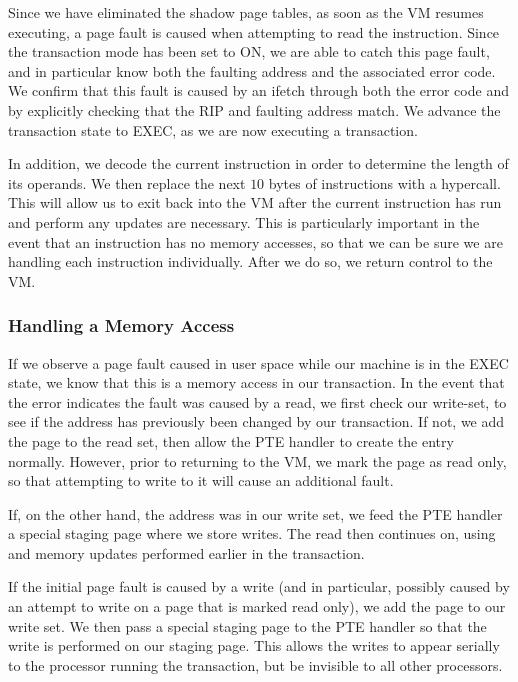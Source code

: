 \documentclass{acm_proc_article-sp}
\begin{document}
Since we have eliminated the shadow page tables, as soon as the VM resumes
executing, a page fault is caused when attempting to read the instruction.
Since the transaction mode has been set to ON, we are able to catch this
page fault, and in particular know both the faulting address and the associated
error code. We confirm that this fault is caused by an ifetch through both
the error code and by explicitly checking that the RIP and faulting address
match. We advance the transaction state to EXEC, as we are now executing
a transaction. 
  
In addition, we decode the current instruction in order to determine the length
of its operands. We then replace the next $10$ bytes of instructions with
a hypercall. This will allow us to exit back into the VM after the current
instruction has run and perform any updates are necessary. This is particularly
important in the event that an instruction has no memory accesses, so that we
can be sure we are handling each instruction individually. After we do so, 
we return control to the VM.

\subsubsection{Handling a Memory Access}

If we observe a page fault caused in user space while our machine is in the
EXEC state, we know that this is a memory access in our transaction. In the 
event that the error indicates the fault was caused by a read, we first check
our write-set, to see if the address has previously been changed by our 
transaction. If not, we add the page to the read set, then allow the PTE
handler to create the entry normally. However, prior to returning to the VM,
we mark the page as read only, so that attempting to write to it will cause
an additional fault.

If, on the other hand, the address was in our write set, we feed the PTE
handler a special staging page where we store writes. The read then continues
on, using and memory updates performed earlier in the transaction.

If the initial page fault is caused by a write (and in particular, possibly 
caused by an attempt to write on a page that is marked read only), we 
add the page to our write set. We then pass a special staging page to the PTE
handler so that the write is performed on our staging page. This allows the 
writes to appear serially to the processor running the transaction, but be
invisible to all other processors.
\end{document}
